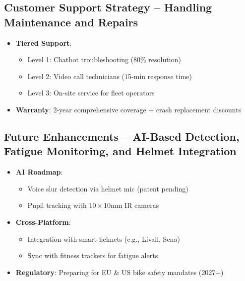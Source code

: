 \documentclass{article}
\begin{document}
\subsection{Customer Support Strategy -- Handling Maintenance and Repairs}
\begin{itemize}
    \item \textbf{Tiered Support}:
    \begin{itemize}
        \item Level 1: Chatbot troubleshooting (80\% resolution)
        \item Level 2: Video call technicians (15-min response time)
        \item Level 3: On-site service for fleet operators
    \end{itemize}
    \item \textbf{Warranty}: 2-year comprehensive coverage + crash replacement discounts
\end{itemize}

\subsection{Future Enhancements -- AI-Based Detection, Fatigue Monitoring, and Helmet Integration}
\begin{itemize}
    \item \textbf{AI Roadmap}:
    \begin{itemize}
        \item Voice slur detection via helmet mic (patent pending)
        \item Pupil tracking with $10 \times 10$mm IR cameras
    \end{itemize}
    \item \textbf{Cross-Platform}:
    \begin{itemize}
        \item Integration with smart helmets (e.g., Livall, Sena)
        \item Sync with fitness trackers for fatigue alerts
    \end{itemize}
    \item \textbf{Regulatory}: Preparing for EU \& US bike safety mandates (2027+)
\end{itemize}
\end{document}
